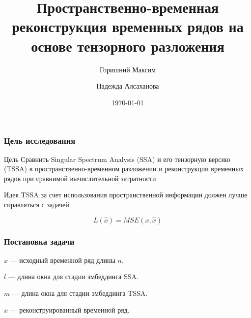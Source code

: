\documentclass[
	11pt, %
]{beamer}
\title[]{Пространственно-временная реконструкция временных рядов на основе тензорного разложения} %
\author[Горишний Максим \and Надежда Алсаханова]{Горишний Максим \and Надежда Алсаханова} %
\institute[]{МФТИ} %
\date[\today]{\today} %
\begin{document}

\begin{frame}
	\titlepage %
\end{frame}




\begin{frame}
	\frametitle{Цель исследования}

\begin{block}{Цель}
Сравнить Singular Spectrum Analysis (SSA) и его тензорную версию (TSSA) в пространственно-временном разложении и реконструкции временных рядов при сравнимой вычислительной затратности
\end{block}

\begin{block}{Идея}
TSSA за счет использования пространственной информации должен лучше справляться с задачей.
\end{block}

\begin{equation*}
L(\hat{x}) = MSE(x, \hat{x})
\end{equation*}

\end{frame}

\begin{frame}
    \frametitle{Постановка задачи}

\(x\) --- исходный временной ряд длины \(n\).

\(l\) --- длина окна для стадии эмбеддинга SSA.

\(m\) --- длина окна для стадии эмбеддинга TSSA.

\(\hat{x}\) --- реконструированный временной ряд.

\end{frame}

\end{document}
